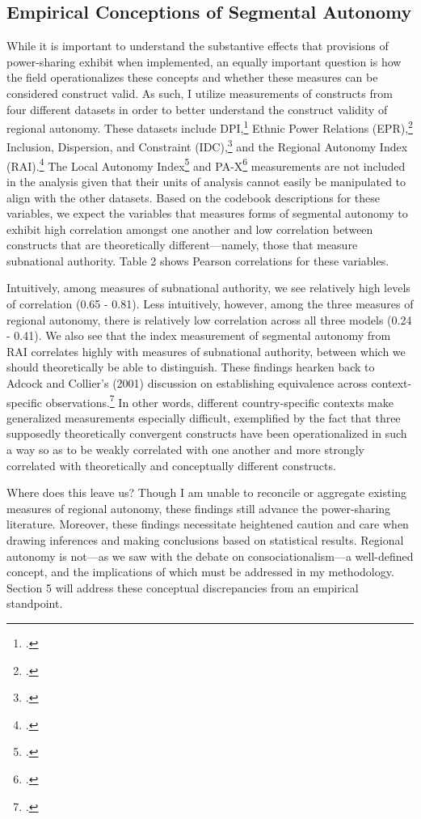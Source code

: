 \documentclass[12pt]{article}
\begin{document}
\subsection{Empirical Conceptions of Segmental Autonomy}
While it is important to understand the substantive effects that provisions of power-sharing exhibit when implemented, an equally important question is how the field operationalizes these concepts and whether these measures can be considered construct valid. As such, I utilize measurements of constructs from four different datasets in order to better understand the construct validity of regional autonomy. These datasets include DPI,\footcite{keefer_database_2018} Ethnic Power Relations (EPR),\footcite{vogt_integrating_2015} Inclusion, Dispersion, and Constraint (IDC),\footcite{strom_inclusion_2017} and the Regional Autonomy Index (RAI).\footcite{hooghe_measuring_2016} The Local Autonomy Index\footcite{ladner_creating_2018} and PA-X\footcite{bell_introducing_2019} measurements are not included in the analysis given that their units of analysis cannot easily be manipulated to align with the other datasets. Based on the codebook descriptions for these variables, we expect the variables that measures forms of segmental autonomy to exhibit high correlation amongst one another and low correlation between constructs that are theoretically different---namely, those that measure subnational authority. Table 2 shows Pearson correlations for these variables.

Intuitively, among measures of subnational authority, we see relatively high levels of correlation (0.65 - 0.81). Less intuitively, however, among the three measures of regional autonomy, there is relatively low correlation across all three models (0.24 - 0.41). We also see that the index measurement of segmental autonomy from RAI correlates highly with measures of subnational authority, between which we should theoretically be able to distinguish. These findings hearken back to Adcock and Collier's (2001) discussion on establishing equivalence across context-specific observations.\footcite[534-535]{adcock_measurement_2001} In other words, different country-specific contexts make generalized measurements especially difficult, exemplified by the fact that three supposedly theoretically convergent constructs have been operationalized in such a way so as to be weakly correlated with one another and more strongly correlated with theoretically and conceptually different constructs.

Where does this leave us? Though I am unable to reconcile or aggregate existing measures of regional autonomy, these findings still advance the power-sharing literature. Moreover, these findings necessitate heightened caution and care when drawing inferences and making conclusions based on statistical results. Regional autonomy is not---as we saw with the debate on consociationalism---a well-defined concept, and the implications of which must be addressed in my methodology. Section 5 will address these conceptual discrepancies from an empirical standpoint. 
\end{document}
